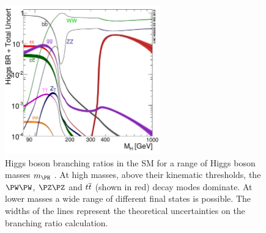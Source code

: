 \begin{figure}[htbp]
 \includegraphics[width=0.6\textwidth]{Chapter01/Images/Higgs_BR.pdf}
\caption[Higgs boson branching ratios in the SM for a range of Higgs boson
masses.]{Higgs boson branching ratios in the SM for a range of Higgs boson
masses $m_{\PH}$ \cite{ARTICLE:HandbookofLHCHiggsCrossSectionsHiggsProperties}. At high masses, above their
kinematic thresholds, the $\PW\PW$,
$\PZ\PZ$ and $t\overline{t}$ (shown in red) decay modes dominate. 
At lower masses a wide range of different final states is possible. 
The widths of the lines represent the
theoretical uncertainties on the branching ratio calculation.}
\label{fig:SMHiggsBRs}
\end{figure}


